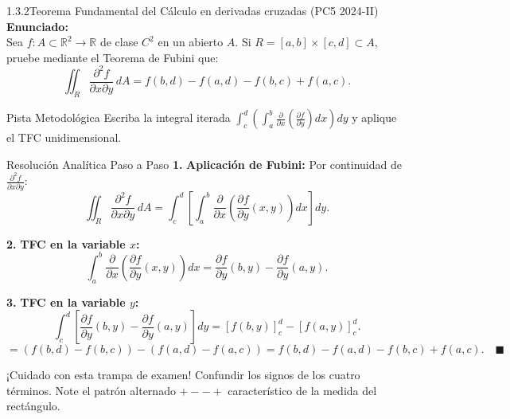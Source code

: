 \documentclass[11pt,a4paper]{article}
\begin{document}
\begin{nivelbox}{1.3.2}{Teorema Fundamental del Cálculo en derivadas cruzadas (PC5 2024-II)}
\textbf{Enunciado:}\\
Sea $f: A \subset \mathbb{R}^2 \to \mathbb{R}$ de clase $C^2$ en un abierto $A$. Si $R = [a,b] \times [c,d] \subset A$, pruebe mediante el Teorema de Fubini que:
\[\iint_R \frac{\partial^2 f}{\partial x \partial y} \, dA = f(b,d) - f(a,d) - f(b,c) + f(a,c).\]

\begin{observacionbox}{Pista Metodológica}
Escriba la integral iterada $\int_c^d \left( \int_a^b \frac{\partial}{\partial x}\left(\frac{\partial f}{\partial y}\right) dx \right) dy$ y aplique el TFC unidimensional.
\end{observacionbox}

\begin{ejerciciobox}{Resolución Analítica Paso a Paso}
\smallskip\noindent\textbf{1.} \textbf{Aplicación de Fubini:}
Por continuidad de $\frac{\partial^2 f}{\partial x \partial y}$:
\[\iint_R \frac{\partial^2 f}{\partial x \partial y} \, dA = \int_c^d \left[ \int_a^b \frac{\partial}{\partial x} \left( \frac{\partial f}{\partial y}(x,y) \right) dx \right] dy.\]

\smallskip\noindent\textbf{2.} \textbf{TFC en la variable $x$:}
\[\int_a^b \frac{\partial}{\partial x} \left( \frac{\partial f}{\partial y}(x,y) \right) dx = \frac{\partial f}{\partial y}(b, y) - \frac{\partial f}{\partial y}(a, y).\]

\smallskip\noindent\textbf{3.} \textbf{TFC en la variable $y$:}
\[\int_c^d \left[ \frac{\partial f}{\partial y}(b, y) - \frac{\partial f}{\partial y}(a, y) \right] dy = [f(b, y)]_c^d - [f(a, y)]_c^d.\]
\[= (f(b,d) - f(b,c)) - (f(a,d) - f(a,c)) = f(b,d) - f(a,d) - f(b,c) + f(a,c). \quad \blacksquare\]
\end{ejerciciobox}

\begin{errorbox}{¡Cuidado con esta trampa de examen!}
Confundir los signos de los cuatro términos. Note el patrón alternado $+ - - +$ característico de la medida del rectángulo.
\end{errorbox}
\end{nivelbox}
\bigskip
\end{document}

